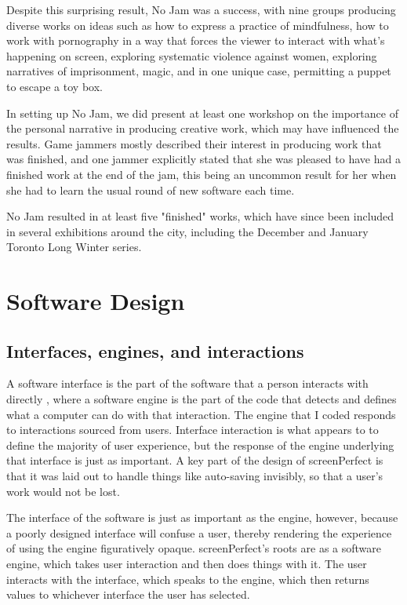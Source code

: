 Despite this surprising result, No Jam was a success, with nine groups producing diverse works on ideas such as how to express a practice of mindfulness, how to work with pornography in a way that forces the viewer to interact with what's happening on screen, exploring systematic violence against women, exploring narratives of imprisonment, magic, and in one unique case, permitting a puppet to escape a toy box. 

In setting up No Jam, we did present at least one workshop on the importance of the personal narrative in producing creative work, which may have influenced the results. Game jammers mostly described their interest in producing work that was finished, and one jammer explicitly stated that she was pleased to have had a finished work at the end of the jam, this being an uncommon result for her when she had to learn the usual round of new software each time.

No Jam resulted in at least five "finished" works, which have since been included in several exhibitions around the city, including the December and January Toronto Long Winter series.



\section{Software Design}
\subsection{Interfaces, engines, and interactions}

A software interface is the part of the software that a person interacts with directly \cite{interactiondestext}, where a software engine is the part of the code that detects and defines what a computer can do with that interaction. The engine that I coded responds to interactions sourced from users. Interface interaction is what appears to to define the majority of user experience, but the response of the engine underlying that interface is just as important. A key part of the design of screenPerfect is that it was laid out to handle things like auto-saving invisibly, so that a user's work would not be lost.

The interface of the software is just as important as the engine, however, because a poorly designed interface will confuse a user, thereby rendering the experience of using the engine figuratively opaque. screenPerfect's roots are as a software engine, which takes user interaction and then does things with it. The user interacts with the interface, which speaks to the engine, which then returns values to whichever interface the user has selected.

